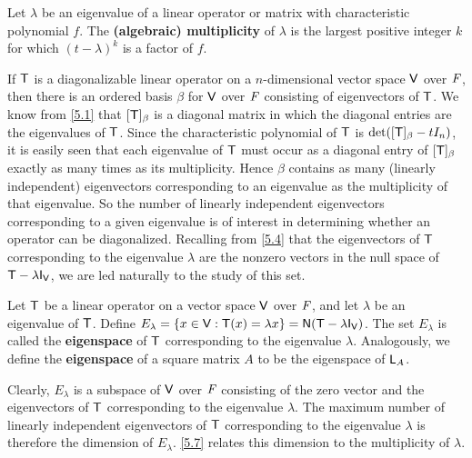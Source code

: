 \begin{defn}\label{5.2.3}
  Let \(\lambda\) be an eigenvalue of a linear operator or matrix with characteristic polynomial \(f\).
  The \textbf{(algebraic) multiplicity} of \(\lambda\) is the largest positive integer \(k\) for which \((t - \lambda)^k\) is a factor of \(f\).
\end{defn}

\begin{note}
  If \(\mathsf{T}\) is a diagonalizable linear operator on a \(n\)-dimensional vector space \(\mathsf{V}\) over \(\mathit{F}\), then there is an ordered basis \(\beta\) for \(\mathsf{V}\) over \(\mathit{F}\) consisting of eigenvectors of \(\mathsf{T}\).
  We know from \cref{5.1} that \([\mathsf{T}]_{\beta}\) is a diagonal matrix in which the diagonal entries are the eigenvalues of \(\mathsf{T}\).
  Since the characteristic polynomial of \(\mathsf{T}\) is \(\det([\mathsf{T}]_{\beta} - t I_n)\), it is easily seen that each eigenvalue of \(\mathsf{T}\) must occur as a diagonal entry of \([\mathsf{T}]_{\beta}\) exactly as many times as its multiplicity.
  Hence \(\beta\) contains as many (linearly independent) eigenvectors corresponding to an eigenvalue as the multiplicity of that eigenvalue.
  So the number of linearly independent eigenvectors corresponding to a given eigenvalue is of interest in determining whether an operator can be diagonalized.
  Recalling from \cref{5.4} that the eigenvectors of \(\mathsf{T}\) corresponding to the eigenvalue \(\lambda\) are the nonzero vectors in the null space of \(\T - \lambda \IT[\V]\), we are led naturally to the study of this set.
\end{note}

\begin{defn}\label{5.2.4}
  Let \(\mathsf{T}\) be a linear operator on a vector space \(\mathsf{V}\) over \(\mathit{F}\), and let \(\lambda\) be an eigenvalue of \(\mathsf{T}\).
  Define \(E_\lambda = \set{x \in \V : \T(x) = \lambda x} = \ns{\T - \lambda \IT[\V]}\).
  The set \(E_\lambda\) is called the \textbf{eigenspace} of \(\mathsf{T}\) corresponding to the eigenvalue \(\lambda\).
  Analogously, we define the \textbf{eigenspace} of a square matrix \(A\) to be the eigenspace of \(\mathsf{L}_A\).
\end{defn}

\begin{note}
  Clearly, \(E_{\lambda}\) is a subspace of \(\mathsf{V}\) over \(\mathit{F}\) consisting of the zero vector and the eigenvectors of \(\mathsf{T}\) corresponding to the eigenvalue \(\lambda\).
  The maximum number of linearly independent eigenvectors of \(\mathsf{T}\) corresponding to the eigenvalue \(\lambda\) is therefore the dimension of \(E_{\lambda}\).
  \cref{5.7} relates this dimension to the multiplicity of \(\lambda\).
\end{note}

